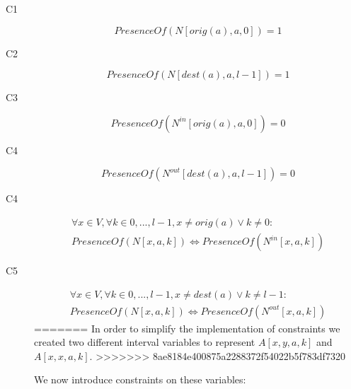 \documentclass[12pt, a4paper, hidelinks]{article}
\numberwithin{equation}{section}
\begin{document}
\begin{description}
\item [C1] \begin{equation} PresenceOf(N[orig(a),a,0]) = 1 \end{equation}
\item [C2] \begin{equation} PresenceOf(N[dest(a),a,l-1]) = 1 \end{equation}
\item [C3] \begin{equation} PresenceOf(N^{in}[orig(a),a,0]) = 0 \end{equation}
\item [C4] \begin{equation} PresenceOf(N^{out}[dest(a),a,l-1]) = 0 \end{equation}
\item [C4] \begin{equation}\begin{split} \forall x \in V, \forall k \in {0,...,l-1}, x \neq orig(a) \lor k \neq 0: \\ PresenceOf(N[x,a,k]) \iff PresenceOf(N^{in}[x,a,k]) \end{split}\end{equation}
\item [C5] \begin{equation}\begin{split} \forall x \in V, \forall k \in {0,...,l-1}, x \neq dest(a) \lor k \neq l-1: \\ PresenceOf(N[x,a,k]) \iff PresenceOf(N^{out}[x,a,k]) \end{split}\end{equation}
=======
In order to simplify the implementation of constraints we created two different interval variables to represent $A[x,y,a,k]$ and $A[x,x,a,k]$.
>>>>>>> 8ae8184e400875a2288372f54022b5f783df7320

We now introduce constraints on these variables:


\end{description}
\end{document}
